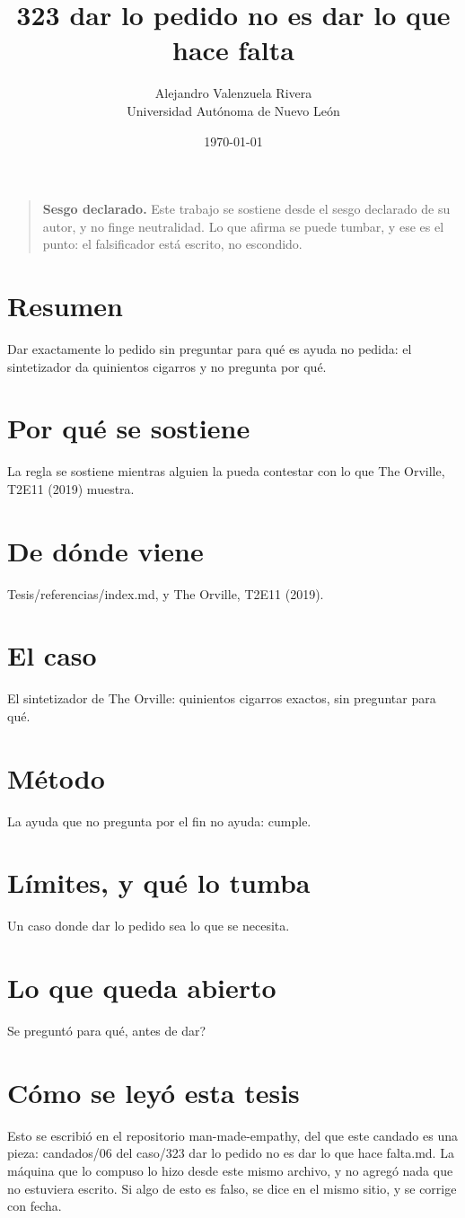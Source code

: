 \documentclass[11pt,a4paper]{article}
\title{323 dar lo pedido no es dar lo que hace falta}
\author{Alejandro Valenzuela Rivera\\\small Universidad Autónoma de Nuevo León}
\date{\today}
\begin{document}
\maketitle

\begin{quote}
\textbf{Sesgo declarado.} Este trabajo se sostiene desde el sesgo declarado de su autor, y no finge neutralidad. Lo que afirma se puede tumbar, y ese es el punto: el falsificador está escrito, no escondido.
\end{quote}

\section*{Resumen}
Dar exactamente lo pedido sin preguntar para qué es ayuda no pedida: el sintetizador da quinientos cigarros y no pregunta por qué.

\section{Por qué se sostiene}
La regla se sostiene mientras alguien la pueda contestar con lo que The Orville, T2E11 (2019) muestra.

\section{De dónde viene}
Tesis/referencias/index.md, y The Orville, T2E11 (2019).

\section{El caso}
El sintetizador de The Orville: quinientos cigarros exactos, sin preguntar para qué.

\section{Método}
La ayuda que no pregunta por el fin no ayuda: cumple.

\section{Límites, y qué lo tumba}
Un caso donde dar lo pedido sea lo que se necesita.

\section{Lo que queda abierto}
\textquestiondown{}Se preguntó para qué, antes de dar?

\section*{Cómo se leyó esta tesis}
Esto se escribió en el repositorio man-made-empathy, del que este candado es una pieza: candados/06 del caso/323 dar lo pedido no es dar lo que hace falta.md. La máquina que lo compuso lo hizo desde este mismo archivo, y no agregó nada que no estuviera escrito. Si algo de esto es falso, se dice en el mismo sitio, y se corrige con fecha.
\end{document}
